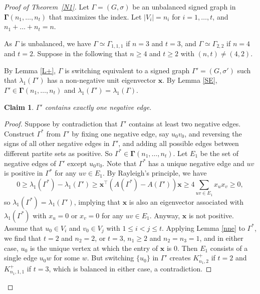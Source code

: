 \documentclass[10pt,a4paper]{amsart}
\numberwithin{equation}{section}
\newtheorem {Claim} {Claim}[section]
\begin{document}
\begin{proof}[Proof of Theorem~\ref{N1}]
Let $\Gamma=(G,\sigma)$ be an unbalanced signed graph in $\boldsymbol\Gamma(n_1,\dots, n_t)$ that maximizes the index. 
Let $|V_i|=n_i$ for $i=1, \dots, t$, and $n_1+\dots+n_t=n$. 

As $\Gamma$ is unbalanced, we have $\Gamma\simeq \Gamma_{1,1,1}$ if $n=3$ and $t=3$, and $\Gamma\simeq \Gamma_{2,2}$ if $n=4$ and $t=2$. 
Suppose in the following that $n\ge 4$ and $t\ge 2$ with $(n,t)\ne (4,2)$. 

By Lemma \ref{L+},  $\Gamma$ is switching equivalent to
a signed graph $\Gamma'=(G,\sigma')$  such that $\lambda_1(\Gamma')$ has a non-negative unit eigenvector $\mathbf{x}$. 
By Lemma \ref{SE}, $\Gamma'\in \boldsymbol\Gamma(n_1,\dots, n_t)$ and $\lambda_1(\Gamma')=\lambda_1(\Gamma)$. 

\begin{Claim}\label{onene}
$\Gamma'$ contains exactly one negative edge. 
\end{Claim}

\begin{proof}
Suppose by contradiction  that $\Gamma'$ contains at least two negative edges. 
Construct $\Gamma^*$ from $\Gamma'$ by fixing one negative edge, say $u_0v_0$, and reversing the signs of all other negative edges in $\Gamma'$, and adding all possible edges between different partite sets as positive. So $\Gamma^*\in \boldsymbol\Gamma (n_1,\dots, n_t)$. Let $E_1$ be the set of negative edges of $\Gamma'$ except $u_0v_0$. %
Note that $\Gamma^*$ has a unique negative edge and $uv$ is positive in $\Gamma^*$ for any $uv\in E_1$. 
By Rayleigh's principle, we have
\[
0\ge \lambda_1(\Gamma^*)-\lambda_1(\Gamma')\ge \mathbf{x}^\top\left(A(\Gamma^*)-A(\Gamma')\right)\mathbf{x}\ge 4\sum_{uv\in E_1}x_{u}x_{v}\ge 0, 
\]
so $\lambda_1(\Gamma^*)=\lambda_1(\Gamma')$, implying that $\mathbf{x}$ is also an eigenvector associated with $\lambda_1(\Gamma^*)$ with  $x_{u}=0$ or $x_{v}=0$ for any $uv\in E_1$. Anyway, $\mathbf{x}$ is not positive.
Assume that $u_0\in V_i$ and $v_0\in V_j$ with $1\le i<j\le t$. 
Applying Lemma \ref{nne} to $\Gamma^*$, we find that  $t=2$ and $n_2=2$, 
or $t=3$, $n_1\ge 2$ and $n_2=n_3=1$, and in either case, $u_0$ is the unique vertex at which the entry of $\mathbf{x}$ is $0$. Then $E_1$ consists of a single edge $u_0w$ for some $w$. But  switching $\{u_0\}$ in $\Gamma'$ creates  $K_{n_1,2}^+$ if $t=2$ and $K_{n_1,1,1}^+$ if $t=3$, which is balanced in either case, a contradiction. 
\end{proof}




\end{proof}
\end{document}
